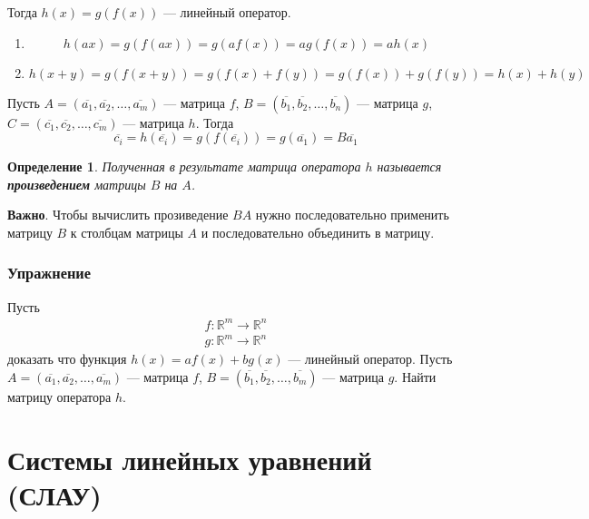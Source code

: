 \documentclass[]{article}
\newtheorem{definition}{Определение}
\begin{document}
Тогда $h(x)=g(f(x))$ --- линейный оператор.

\begin{enumerate}
	\item
	\begin{equation*}
		h(ax)=g(f(ax))=g(af(x))=ag(f(x))=ah(x)
	\end{equation*}
	\item
\begin{equation*}
	h(x+y)=g(f(x+y))=g(f(x)+f(y))=g(f(x))+g(f(y))=h(x)+h(y)
\end{equation*}
\end{enumerate}


Пусть $A=(\overline{a_1},\overline{a_2},\ldots,\overline{a_m})$ --- матрица $f$, $B=(\overline{b_1},\overline{b_2},\ldots,\overline{b_n})$ --- матрица $g$, $C=(\overline{c_1},\overline{c_2},\ldots,\overline{c_m})$ --- матрица $h$. Тогда
\begin{equation*}
	\overline{c_i}=h(\overline{e_i})=g(f(\overline{e_i}))=g(\overline{a_1})=B\overline{a_1}
\end{equation*}

\begin{definition}
	Полученная в результате матрица оператора $h$ называется \textbf{произведением} матрицы $B$ на $A$.
\end{definition}

\textbf{Важно}. Чтобы вычислить прозиведение $BA$ нужно последовательно применить матрицу $B$ к столбцам матрицы $A$ и последовательно объединить в матрицу.

\subsubsection{Упражнение}
Пусть \begin{gather*}
	f:\mathbb{R}^m\rightarrow\mathbb{R}^n
	\\
	g:\mathbb{R}^m\rightarrow\mathbb{R}^n
\end{gather*}
доказать что функция $h(x)=af(x)+bg(x)$ --- линейный оператор. Пусть $A=(\overline{a_1},\overline{a_2},\ldots,\overline{a_m})$ --- матрица $f$, $B=(\overline{b_1},\overline{b_2},\ldots,\overline{b_m})$ --- матрица $g$. Найти матрицу оператора $h$.

\section{Системы линейных уравнений (СЛАУ)}
\end{document}
